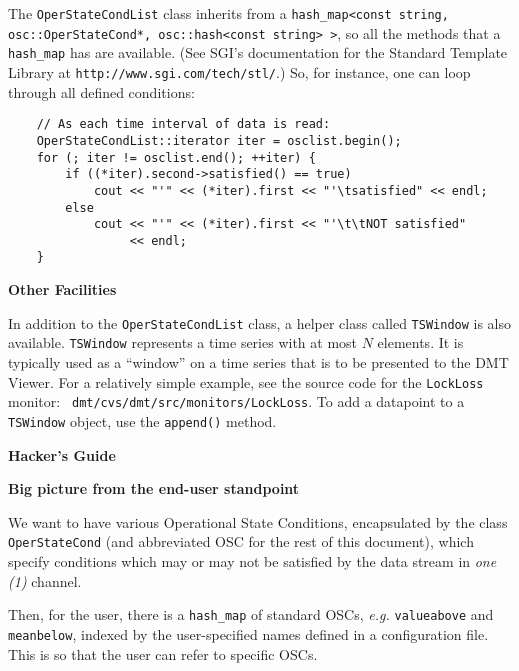 \documentclass[11pt]{article}
\begin{document}
The \texttt{OperStateCondList} class inherits from a \texttt{hash\_map<const
  string, osc::OperStateCond*, osc::hash<const string> >}, so all the
methods that a \texttt{hash\_map} has are available.  (See SGI's
documentation for the Standard Template Library at
\texttt{http://www.sgi.com/tech/stl/}.) So, for instance, one can loop
  through all defined conditions:
  
\begin{verbatim}
    // As each time interval of data is read:
    OperStateCondList::iterator iter = osclist.begin();
    for (; iter != osclist.end(); ++iter) {
        if ((*iter).second->satisfied() == true)
            cout << "'" << (*iter).first << "'\tsatisfied" << endl;
        else
            cout << "'" << (*iter).first << "'\t\tNOT satisfied" 
                 << endl;
    }
\end{verbatim}
  
\begin{center}
  \textbf{{\large Other Facilities}}
\end{center}

In addition to the \texttt{OperStateCondList} class, a helper class
called \texttt{TSWindow} is also available.  \texttt{TSWindow}
represents a time series with at most $N$ elements.  It is typically
used as a ``window'' on a time series that is to be presented to the
DMT Viewer.  For a relatively simple example, see the source code for
the \texttt{LockLoss} monitor:
\texttt{~dmt/cvs/dmt/src/monitors/LockLoss}. To add a datapoint to a
\texttt{TSWindow} object, use the \texttt{append()} method.

\newpage

\begin{center}\textbf{{\large Hacker's Guide}}\end{center}

\begin{center}
  \textbf{Big picture from the end-user standpoint}
\end{center}

We want to have various Operational State Conditions, encapsulated by
the class \texttt{OperStateCond} (and abbreviated OSC for the rest of
this document), which specify conditions which may or may not be
satisfied by the data stream in \textit{one (1)} channel.

Then, for the user, there is a \texttt{hash\_map} of standard OSCs,
\textit{e.g.} \texttt{valueabove} and \texttt{meanbelow}, indexed by
the user-specified names defined in a configuration file. This is so
that the user can refer to specific OSCs.
\end{document}
